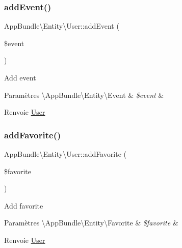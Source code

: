 \subsubsection{\texorpdfstring{add\+Event()}{addEvent()}}
{\footnotesize\ttfamily App\+Bundle\textbackslash{}\+Entity\textbackslash{}\+User\+::add\+Event (\begin{DoxyParamCaption}\item[{\textbackslash{}\hyperlink{classAppBundle_1_1Entity_1_1Event}{App\+Bundle\textbackslash{}\+Entity\textbackslash{}\+Event}}]{\$event }\end{DoxyParamCaption})}

Add event


\begin{DoxyParams}[1]{Paramètres}
\textbackslash{}\+App\+Bundle\textbackslash{}\+Entity\textbackslash{}\+Event & {\em \$event} & \\
\hline
\end{DoxyParams}
\begin{DoxyReturn}{Renvoie}
\hyperlink{classAppBundle_1_1Entity_1_1User}{User} 
\end{DoxyReturn}
\mbox{\label{classAppBundle_1_1Entity_1_1User_a80ba0ef78ad298274abe11cbc6b7e5dc}} 
\subsubsection{\texorpdfstring{add\+Favorite()}{addFavorite()}}
{\footnotesize\ttfamily App\+Bundle\textbackslash{}\+Entity\textbackslash{}\+User\+::add\+Favorite (\begin{DoxyParamCaption}\item[{\textbackslash{}\hyperlink{classAppBundle_1_1Entity_1_1Favorite}{App\+Bundle\textbackslash{}\+Entity\textbackslash{}\+Favorite}}]{\$favorite }\end{DoxyParamCaption})}

Add favorite


\begin{DoxyParams}[1]{Paramètres}
\textbackslash{}\+App\+Bundle\textbackslash{}\+Entity\textbackslash{}\+Favorite & {\em \$favorite} & \\
\hline
\end{DoxyParams}
\begin{DoxyReturn}{Renvoie}
\hyperlink{classAppBundle_1_1Entity_1_1User}{User} 
\end{DoxyReturn}
\mbox{\label{classAppBundle_1_1Entity_1_1User_ad089e5a875b330dcc623176a025df18a}} 
